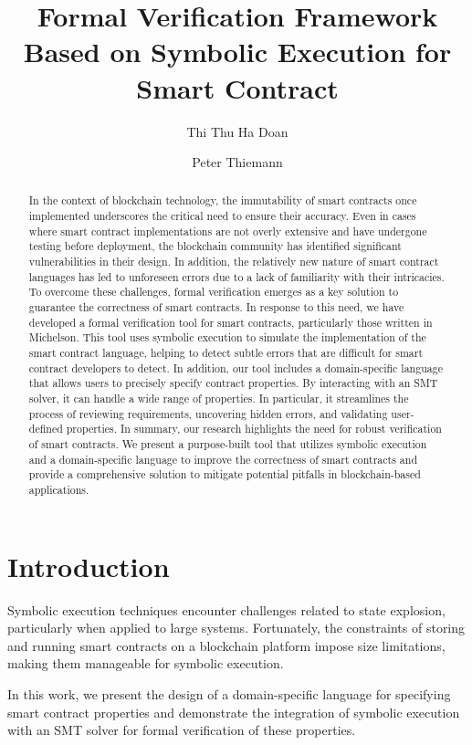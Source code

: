 \documentclass[a4paper,UKenglish,cleveref, autoref, thm-restate]{lipics-v2021}
\title{Formal Verification Framework Based on Symbolic Execution for Smart Contract} %
\author{Thi Thu Ha Doan}{University of Freiburg, Germany}{doanha@informatik.uni-freiburg.de}{https://orcid.org/0000−0001−7524−4497}{(Optional) author-specific funding acknowledgements}%
\author{Peter Thiemann}{University of Freiburg, Germany}{thiemann@informatik.uni-freiburg.de}{https://orcid.org/0000−0002−9000−1239}{[funding]}
\begin{document}
\maketitle

\begin{abstract}
In the context of blockchain technology, the immutability of smart contracts once implemented underscores the critical need to ensure their accuracy. Even in cases where smart contract implementations are not overly extensive and have undergone testing before deployment, the blockchain community has identified significant vulnerabilities in their design. In addition, the relatively new nature of smart contract languages has led to unforeseen errors due to a lack of familiarity with their intricacies. To overcome these challenges, formal verification emerges as a key solution to guarantee the correctness of smart contracts. In response to this need, we have developed a formal verification tool for smart contracts, particularly those written in Michelson. This tool uses symbolic execution to simulate the implementation of the smart contract language, helping to detect subtle errors that are difficult for smart contract developers to detect. In addition, our tool includes a domain-specific language that allows users to precisely specify contract properties. By interacting with an SMT solver, it can handle a wide range of properties. In particular, it streamlines the process of reviewing requirements, uncovering hidden errors, and validating user-defined properties. In summary, our research highlights the need for robust verification of smart contracts. We present a purpose-built tool that utilizes symbolic execution and a domain-specific language to improve the correctness of smart contracts and provide a comprehensive solution to mitigate potential pitfalls in blockchain-based applications.
\end{abstract}
\section{Introduction}
\label{sec:introduction}
Symbolic execution techniques encounter challenges related to state explosion, particularly when applied to large systems. Fortunately, the constraints of storing and running smart contracts on a blockchain platform impose size limitations, making them manageable for symbolic execution.

In this work, we present the design of a domain-specific language for specifying smart contract properties and demonstrate the integration of symbolic execution with an SMT solver for formal verification of these properties.
\end{document}
